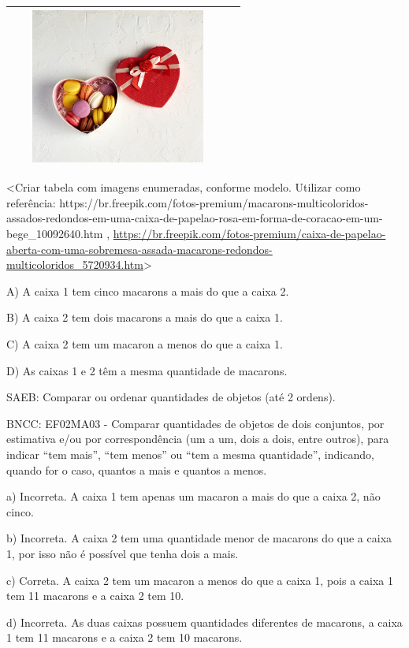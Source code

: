 \begin{escolha}
\begin{escolha}
{{{{{{{{\begin{longtable}[]{@{}ll@{}}
\begin{minipage}[t]{0.48\columnwidth}
\includegraphics[width=2.80101in,height=2.01728in]{media/image164.png}\strut
\end{minipage}\tabularnewline
\bottomrule
\end{longtable}

\textless{}Criar tabela com imagens enumeradas, conforme modelo.
Utilizar como referência:
https://br.freepik.com/fotos-premium/macarons-multicoloridos-assados-redondos-em-uma-caixa-de-papelao-rosa-em-forma-de-coracao-em-um-bege\_10092640.htm
,
\url{https://br.freepik.com/fotos-premium/caixa-de-papelao-aberta-com-uma-sobremesa-assada-macarons-redondos-multicoloridos_5720934.htm}\textgreater{}

A) A caixa 1 tem cinco macarons a mais do que a caixa 2.

B) A caixa 2 tem dois macarons a mais do que a caixa 1.

C) A caixa 2 tem um macaron a menos do que a caixa 1.

D) As caixas 1 e 2 têm a mesma quantidade de macarons.

SAEB: Comparar ou ordenar quantidades de objetos (até 2 ordens).

BNCC: EF02MA03 - Comparar quantidades de objetos de dois conjuntos, por
estimativa e/ou por correspondência (um a um, dois a dois, entre
outros), para indicar ``tem mais'', ``tem menos'' ou ``tem a mesma
quantidade'', indicando, quando for o caso, quantos a mais e quantos a
menos.

a) Incorreta. A caixa 1 tem apenas um macaron a mais do que a caixa 2, não cinco.

b) Incorreta. A caixa 2 tem uma quantidade menor de macarons do que a
caixa 1, por isso não é possível que tenha dois a mais.

c) Correta. A caixa 2 tem um macaron a menos do que a caixa 1, pois a
caixa 1 tem 11 macarons e a caixa 2 tem 10.

d) Incorreta. As duas caixas possuem quantidades diferentes de macarons,
a caixa 1 tem 11 macarons e a caixa 2 tem 10 macarons.

}}}}}}}}
\end{escolha}
\end{escolha}
